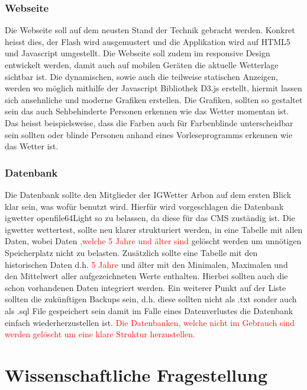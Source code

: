 \documentclass[a4paper,ngerman, 11pt]{report}
\newcommand\Diskussionspunkt[1]{\textcolor{red}{#1}}
\begin{document}
\subsection{Webseite}
Die Webseite soll auf dem neusten Stand der Technik gebracht werden. Konkret heisst dies, der Flash wird ausgemustert und die Applikation wird auf HTML5 und Javascript umgestellt. Die Webseite soll zudem im responsive Design entwickelt werden, damit auch auf mobilen Geräten die aktuelle Wetterlage sichtbar ist. Die dynamischen, sowie auch die teilweise statischen Anzeigen, werden wo möglich mithilfe der Javascript Bibliothek D3.js erstellt, hiermit lassen sich ansehnliche und moderne Grafiken erstellen. Die Grafiken, sollten so gestaltet sein das auch Sehbehinderte Personen erkennen wie das Wetter momentan ist. Das heisst beispielsweise, dass die Farben auch für Farbenblinde unterscheidbar sein sollten oder blinde Personen anhand eines Vorleseprogramms erkennen wie das Wetter ist. 

\subsection{Datenbank}
Die Datenbank sollte den Mitglieder der IGWetter Arbon auf dem ersten Blick klar sein, was wofür benutzt wird. Hierfür wird vorgeschlagen die Datenbank igwetter openfile64Light so zu belassen, da diese für das CMS zuständig ist. Die igwetter wettertest, sollte neu klarer strukturiert werden, in eine Tabelle mit allen Daten, wobei Daten \Diskussionspunkt{,welche 5 Jahre und älter sind} gelöscht werden um unnötigen Speicherplatz nicht zu belasten. Zusätzlich sollte eine Tabelle mit den historischen Daten d.h. \Diskussionspunkt{5 Jahre} und älter mit den Minimalen, Maximalen und den Mittelwert aller aufgezeichneten Werte enthalten. Hierbei sollten auch die schon vorhandenen Daten integriert werden. Ein weiterer Punkt auf der Liste sollten die zukünftigen Backups sein, d.h. diese sollten nicht als .txt sonder auch als .sql File gespeichert sein damit im Falle eines Datenverlustes die Datenbank einfach wiederherzustellen ist. \Diskussionspunkt{Die Datenbanken, welche nicht im Gebrauch sind werden gelöscht um eine klare Struktur herzustellen.}


\chapter{Wissenschaftliche Fragestellung}
\end{document}

